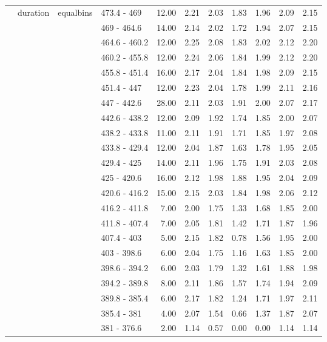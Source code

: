 \begin{longtable}{llllrrrrrrr}
   & duration & equalbins & 473.4 - 469 & 12.00 & 2.21 & 2.03 & 1.83 & 1.96 & 2.09 & 2.15 \\ 
   &  &  & 469 - 464.6 & 14.00 & 2.14 & 2.02 & 1.72 & 1.94 & 2.07 & 2.15 \\ 
   &  &  & 464.6 - 460.2 & 12.00 & 2.25 & 2.08 & 1.83 & 2.02 & 2.12 & 2.20 \\ 
   &  &  & 460.2 - 455.8 & 12.00 & 2.24 & 2.06 & 1.84 & 1.99 & 2.12 & 2.20 \\ 
   &  &  & 455.8 - 451.4 & 16.00 & 2.17 & 2.04 & 1.84 & 1.98 & 2.09 & 2.15 \\ 
   &  &  & 451.4 - 447 & 12.00 & 2.23 & 2.04 & 1.78 & 1.99 & 2.11 & 2.16 \\ 
   &  &  & 447 - 442.6 & 28.00 & 2.11 & 2.03 & 1.91 & 2.00 & 2.07 & 2.17 \\ 
   &  &  & 442.6 - 438.2 & 12.00 & 2.09 & 1.92 & 1.74 & 1.85 & 2.00 & 2.07 \\ 
   &  &  & 438.2 - 433.8 & 11.00 & 2.11 & 1.91 & 1.71 & 1.85 & 1.97 & 2.08 \\ 
   &  &  & 433.8 - 429.4 & 12.00 & 2.04 & 1.87 & 1.63 & 1.78 & 1.95 & 2.05 \\ 
   &  &  & 429.4 - 425 & 14.00 & 2.11 & 1.96 & 1.75 & 1.91 & 2.03 & 2.08 \\ 
   &  &  & 425 - 420.6 & 16.00 & 2.12 & 1.98 & 1.88 & 1.95 & 2.04 & 2.09 \\ 
   &  &  & 420.6 - 416.2 & 15.00 & 2.15 & 2.03 & 1.84 & 1.98 & 2.06 & 2.12 \\ 
   &  &  & 416.2 - 411.8 & 7.00 & 2.00 & 1.75 & 1.33 & 1.68 & 1.85 & 2.00 \\ 
   &  &  & 411.8 - 407.4 & 7.00 & 2.05 & 1.81 & 1.42 & 1.71 & 1.87 & 1.96 \\ 
   &  &  & 407.4 - 403 & 5.00 & 2.15 & 1.82 & 0.78 & 1.56 & 1.95 & 2.00 \\ 
   &  &  & 403 - 398.6 & 6.00 & 2.04 & 1.75 & 1.16 & 1.63 & 1.85 & 2.00 \\ 
   &  &  & 398.6 - 394.2 & 6.00 & 2.03 & 1.79 & 1.32 & 1.61 & 1.88 & 1.98 \\ 
   &  &  & 394.2 - 389.8 & 8.00 & 2.11 & 1.86 & 1.57 & 1.74 & 1.94 & 2.09 \\ 
   &  &  & 389.8 - 385.4 & 6.00 & 2.17 & 1.82 & 1.24 & 1.71 & 1.97 & 2.11 \\ 
   &  &  & 385.4 - 381 & 4.00 & 2.07 & 1.54 & 0.66 & 1.37 & 1.87 & 2.07 \\ 
   &  &  & 381 - 376.6 & 2.00 & 1.14 & 0.57 & 0.00 & 0.00 & 1.14 & 1.14 \\ 

\end{longtable}
